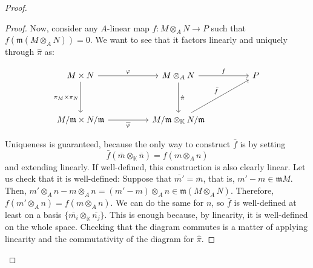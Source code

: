 \begin{problem}
\begin{enumerate}[label=(\theproblem.\arabic*),ref=\theproblem.\arabic*]
\begin{sol}
\begin{proof}
\begin{claim}
\begin{proof}
                                Now, consider any $A$-linear map $f: M \otimes_A N \rightarrow P$ such that $f(\mathfrak{m}(M \otimes_A N)) = 0$.
                                We want to see that it factors linearly and uniquely through $\hat{\pi}$ as:

                                \begin{center}
                                    \[\begin{tikzcd}
                                    {M \times N} && {M \otimes_A N} && P \\
                                    \\
                                    {M / \mathfrak{m} \times N / \mathfrak{m}} && {M / \mathfrak{m} \otimes_{\mathbb{K}} N / \mathfrak{m}}
                                    \arrow["\varphi", from=1-1, to=1-3]
                                    \arrow["{\hat{\pi}}", from=1-3, to=3-3]
                                    \arrow["{\pi_M\times\pi_N}"', from=1-1, to=3-1]
                                    \arrow["{\overline{\varphi}}"', from=3-1, to=3-3]
                                    \arrow["f", from=1-3, to=1-5]
                                    \arrow["{\bar{f}}", from=3-3, to=1-5]
                                \end{tikzcd}\]

                                \end{center}

                                Uniqueness is guaranteed, because the only way to construct
                                $\bar{f}$ is by setting \[{\bar{f}(\overline{m} \otimes_{\mathbb{K}} \overline{n}) = f(m \otimes_A n)}\]
                                and extending linearly.
                                If well-defined, this construction is also clearly linear.
                                Let us check that it is well-defined:
                                Suppose that $\overline{m'} = \overline{m}$, that is, $m' - m \in \mathfrak{m}M$.
                                Then, $m' \otimes_A n - m \otimes_A n = (m' - m) \otimes_A n \in \mathfrak{m}(M \otimes_A N)$.
                                Therefore, $f(m' \otimes_A n) = f(m \otimes_A n)$.
                                We can do the same for $n$, so $\bar{f}$ is well-defined at least on a basis $\{\overline{m_i}\otimes_\mathbb{K}\overline{n_j}\}$.
                                This is enough because, by linearity, it is well-defined on the whole space.
                                Checking that the diagram commutes is a matter of applying linearity and the commutativity of the diagram for $\hat{\pi}$.



\end{proof}
\end{claim}
\end{proof}
\end{sol}
\end{enumerate}
\end{problem}
